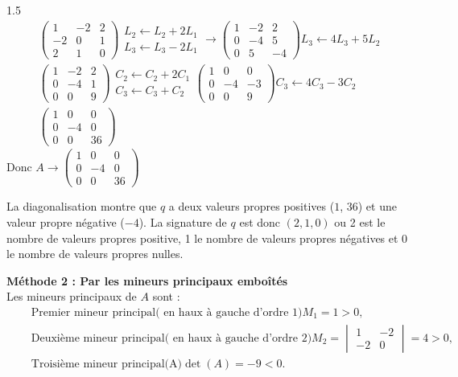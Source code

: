 \documentclass[12pt]{article}
\begin{document}
\begin{spacing}{1.5}
\begin{align*}
\begin{pmatrix}
\boxed{1} & -2 & 2 \\
-2 & 0 & 1 \\
2 & 1 & 0
\end{pmatrix}\begin{array}{c}
L_2\longleftarrow L_2+2L_1\\
L_3\longleftarrow L_3-2L_1
\end{array}
\to
\begin{pmatrix}
\boxed{1} & -2 & 2 \\
0 & -4 & 5 \\
0 & 5 & -4
\end{pmatrix}L_3\longleftarrow 4L_3+5L_2\\
\begin{pmatrix}
\boxed{1} & -2 & 2 \\
0 & -4 & 1 \\
0 & 0 & 9
\end{pmatrix}\begin{array}{c}
C_2\longleftarrow C_2+2C_1\\
C_3\longleftarrow C_3+C_2
\end{array}
\begin{pmatrix}
\boxed{1} & 0 & 0 \\
0 & -4 & -3 \\
0 & 0 & 9
\end{pmatrix}C_3\longleftarrow 4C_3-3C_2\\
\begin{pmatrix}
\boxed{1} & 0 & 0 \\
0 & -4 & 0 \\
0 & 0 & 36
\end{pmatrix}
\end{align*}
Donc $A\to \begin{pmatrix}
1 & 0 & 0 \\
0 & -4 & 0 \\
0 & 0 & 36
\end{pmatrix}$

La diagonalisation montre que $q$ a deux valeurs propres positives ($1$, $36$) et une valeur propre négative ($-4$). La signature de $q$ est donc $(2, 1, 0)$ ou 2 est le nombre de valeurs propres positive, 1 le nombre de valeurs propres négatives et 0 le nombre de valeurs propres nulles.

\textbf{Méthode 2 : Par les mineurs principaux emboîtés} \\
Les mineurs principaux de $A$ sont :
\begin{align*}
&\text{Premier mineur principal( en haux à gauche d'ordre 1)} M_1 = 1>0,\\ \quad 
&\text{Deuxième mineur principal( en haux à gauche d'ordre 2)}M_2 = 
\begin{vmatrix}
1 & -2 \\
-2 & 0
\end{vmatrix} = 4>0,\\ \quad 
&\text{Troisième mineur principal(A)}\det(A) = -9<0.
\end{align*}


\end{spacing}
\end{document}
